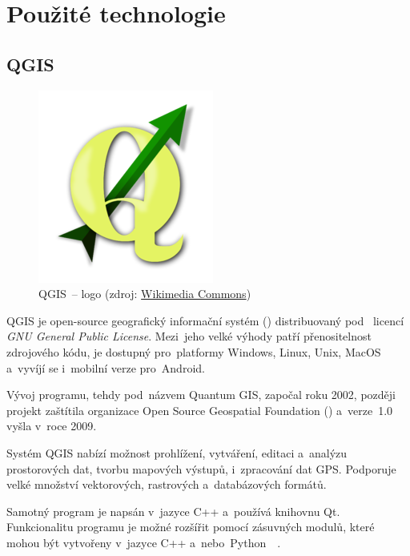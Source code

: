 \chapter{Použité technologie}
\label{technologie}

\section{QGIS}
\label{qgis}

	\begin{figure}[H] \centering
		\includegraphics[width=.3\textwidth]{./pictures/qgis_logo.png}
      	\caption[QGIS~– logo]{QGIS~– logo (zdroj:
\href{https://commons.wikimedia.org/wiki/File:QGis_Logo.png}{Wikimedia
Commons})}
		\label{fig:qgis_logo}
 	\end{figure}

QGIS je open-source geografický informační systém ()
distribuovaný pod ~licencí \textit{GNU General Public
License}. Mezi~jeho velké výhody patří přenositelnost zdrojového kódu,
je dostupný pro~platformy Windows, Linux, Unix, MacOS a~vyvíjí se
i~mobilní verze pro~Android.

Vývoj programu, tehdy pod~názvem Quantum GIS, započal roku 2002,
později projekt zaštítila organizace Open Source Geospatial Foundation
() a~verze~1.0 vyšla v~roce 2009.

Systém QGIS nabízí možnost prohlížení, vytváření, editaci a~analýzu
prostorových dat, tvorbu mapových výstupů, i~zpracování dat
GPS. Podporuje velké množství vektorových, rastrových a~databázových
formátů.

Samotný program je napsán v~jazyce C++ a~používá knihovnu
Qt. Funkcionalitu programu je možné rozšířit pomocí zásuvných modulů,
které mohou být vytvořeny v~jazyce C++
a~nebo~Python~\citep{qgis}~\citep{wiki_qgis}.

